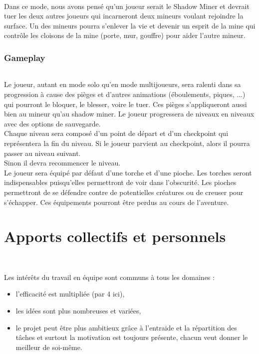 \documentclass[titlepage, 13px, a4paper]{article}
\begin{document}
\paragraph{} \hspace{0pt}
Dans ce mode, nous avons pensé qu'un joueur serait le Shadow Miner 
et devrait tuer les deux autres joueurs qui incarneront deux mineurs voulant rejoindre la surface. 
Un des mineurs pourra s’enlever la vie et devenir un esprit de la mine 
qui contrôle les cloisons de la mine (porte, mur, gouffre) pour aider l’autre mineur.

\section{Gameplay}
\paragraph{} \hspace{0pt}
Le joueur, autant en mode solo qu'en mode multijoueurs, sera ralenti dans sa progression 
à cause des pièges et d'autres animations (éboulements, piques, ...)  qui pourront le bloquer, le blesser, voire le tuer. 
Ces pièges s’appliqueront aussi bien au mineur qu'au shadow miner.
Le joueur progressera de niveaux en niveaux avec des options de sauvegarde.
\\
Chaque niveau sera composé d’un point de départ et d'un checkpoint qui représentera la fin du niveau.
Si le joueur parvient au checkpoint, alors il pourra passer au niveau suivant.
\\
Sinon il devra recommencer le niveau.
\\
Le joueur sera équipé par défaut d'une torche et d'une pioche. Les torches seront indispensables puisqu'elles permettront de voir dans l'obscurité.
Les pioches permettront de se défendre contre de potentielles créatures ou de creuser pour s'échapper.
Ces équipements pourront être perdus au cours de l'aventure.


\newpage

\part{Apports collectifs et personnels}

\paragraph{} \hspace{0pt} \\
Les intérêts du travail en équipe sont communs à tous les domaines :
\begin{itemize}
	\item l'efficacité est multipliée (par 4 ici),
	\item les idées sont plus nombreuses et variées,
	\item le projet peut être plus ambitieux grâce à l'entraide et la répartition des tâches et surtout la motivation est toujours présente, chacun veut donner le meilleur de soi-même. 
\end{itemize}
\end{document}
